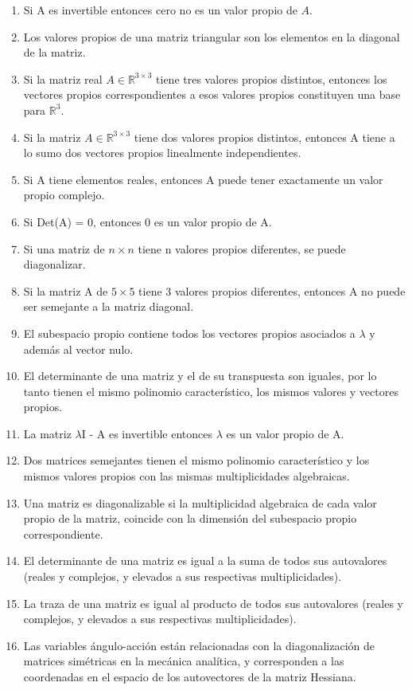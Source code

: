 \begin{enumerate}

\item
 
  Si A es invertible entonces cero no es un valor propio de $A$.
\item
 
  Los valores propios de una matriz triangular son los elementos  en la diagonal de la matriz.
 \item

  Si la matriz real  $A \in \mathbb{R}^{3\times 3}$ tiene tres valores propios distintos, entonces los vectores propios correspondientes a esos valores propios constituyen una base para $\mathbb{R}^3$.

 \item
 Si la matriz $A \in \mathbb{R}^{3\times 3}$ tiene dos valores propios distintos, entonces A tiene a lo sumo dos vectores propios linealmente independientes.
 
\item
 Si A tiene elementos reales, entonces A puede tener exactamente un valor propio complejo.
 \item
 Si Det(A) = 0, entonces 0 es un valor propio de A.
 \item
  Si una matriz de $n \times n$ tiene n valores propios diferentes, se puede diagonalizar.
 \item
  Si la matriz A de $5 \times 5$ tiene 3 valores propios diferentes, entonces A no puede ser semejante a la matriz diagonal.
 \item
  El subespacio propio contiene todos los vectores propios asociados a $\lambda$ y además al vector nulo.
 \item
 El determinante de una matriz y el de su transpuesta son iguales, por lo tanto tienen el mismo polinomio característico, los mismos valores y vectores propios.
 \item
  La matriz $\lambda$I - A es invertible entonces $\lambda$ es un valor propio de A.

 \item
 Dos matrices semejantes tienen el mismo polinomio característico y los mismos valores propios con las mismas multiplicidades algebraicas. 
 \item
  Una matriz es diagonalizable si la multiplicidad algebraica de cada valor propio de la matriz, coincide con la dimensión del subespacio propio correspondiente.
	\item
	 El determinante de una matriz es igual a la suma de todos sus autovalores (reales y complejos,
y elevados a sus respectivas multiplicidades).
\item
La traza de una matriz es igual al producto de todos sus autovalores (reales y complejos,
y elevados a sus respectivas multiplicidades).
\item
Las variables ángulo-acción están relacionadas con la diagonalización de matrices simétricas en la mecánica analítica, y corresponden a las coordenadas en el espacio de los autovectores de la matriz Hessiana.

\end{enumerate}
 
